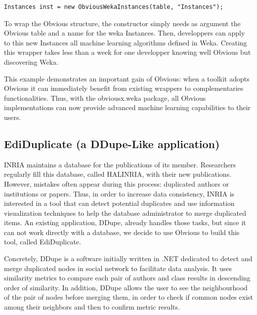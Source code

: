 \begin{lstlisting}[caption={Wrapping an Obvious Table into Weka Instances},label=wekaExample]
Instances inst = new ObviousWekaInstances(table, "Instances");
\end{lstlisting}

To wrap the Obvious structure, the constructor simply needs as argument the Obvious table and a name for the weka Instances. Then, developpers can apply to this new Instances all machine learning algorithms defined in Weka. Creating this wrapper takes less than a week for one developper knowing well Obvious but discovering Weka.

This example demonstrates an important gain of Obvious: when a toolkit adopts Obvious it can immediately benefit from existing wrappers to complementaries functionalities. Thus, with the obviousx.weka package, all Obvious implementations can now provide advanced machine learning capabilities to their users.

\subsection{EdiDuplicate (a DDupe-Like application)}

INRIA maintains a database for the publications of its member. Researchers regularly fill this database, called HALINRIA, with their new publications. However, mistakes often appear during this process: duplicated authors or institutions or papers. Thus, in order to increase data consistency, INRIA is interested in a tool that can detect potential duplicates and use information visualization techniques to help the database administrator to merge duplicated items. An existing application, DDupe, already handles those tasks, but since it can not work directly with a database, we decide to use Obvious to build this tool, called EdiDuplicate.

Concretely, DDupe is a software initially written in .NET dedicated to detect and merge duplicated nodes  in social network to facilitate data analysis. It uses similarity metrics to compare each pair  of authors and class results in descending order of similarity. In addition, DDupe allows the user to see the neighbourhood of the pair of nodes before merging them, in order to check if common nodes exist among their neighbors and then to confirm metric results.

